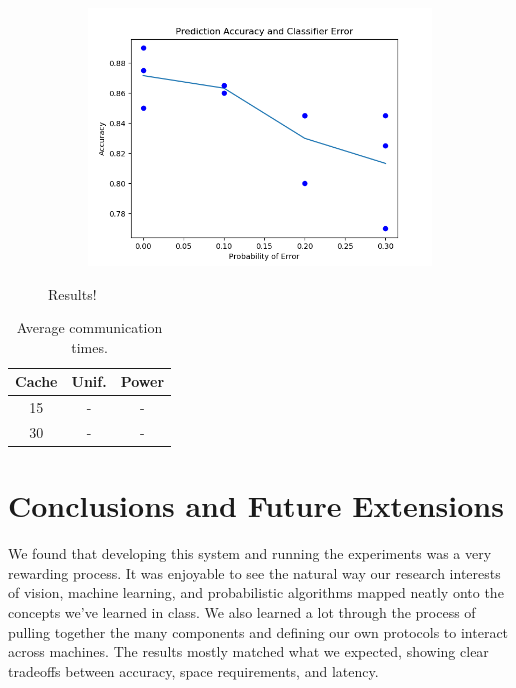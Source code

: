 \documentclass[12pt]{article}
\begin{document}
\begin{figure}
\begin{subfigure}{0.3\textwidth}
        \includegraphics[width=\textwidth]{plot_1_line_and_points.png}
    \end{subfigure}
    \caption{Results!}
    \label{fig:results}
\end{figure}


\begin{table}
    \begin{tabular}{|c|c|c|}
        \hline
        Cache & Unif. & Power \\ \hline
        15 & - & - \\ \hline
        30 & - & - \\ \hline
    \end{tabular}
    \label{tab:cache}
    \caption{Average communication times.}%
\end{table}

\section{Conclusions and Future Extensions}

We found that developing this system and running the experiments was a very rewarding process.
It was enjoyable to see the natural way our research interests of vision, machine learning, and probabilistic algorithms mapped neatly onto the concepts we've learned in class.
We also learned a lot through the process of pulling together the many components and defining our own protocols to interact across machines.
The results mostly matched what we expected, showing clear tradeoffs between accuracy, space requirements, and latency.
\end{document}
